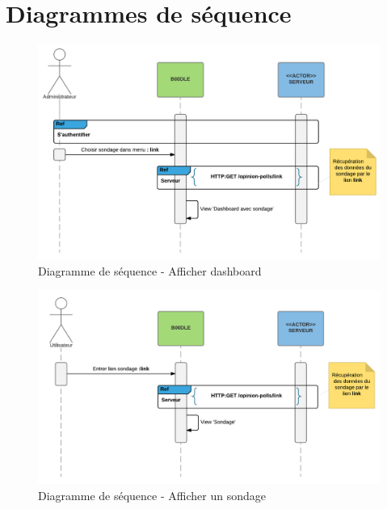 \documentclass[titlepage]{report}
\begin{document}
\clearpage
\chapter{Diagrammes de séquence}

\begin{figure}[h]
	\caption{Diagramme de séquence - Afficher dashboard}
	\label{annexe_diagramme_sequence_afficherDashboard}
	\centering
	\includegraphics[width=\textwidth]{figures/diagrammes/sequence_afficherDashboard.png}
\end{figure}

\begin{figure}[h]
	\caption{Diagramme de séquence - Afficher un sondage}
	\label{annexe_diagramme_sequence_afficherSondage}
	\centering
	\includegraphics[width=\textwidth]{figures/diagrammes/sequence_afficherSondage.png}
\end{figure}
\end{document}
